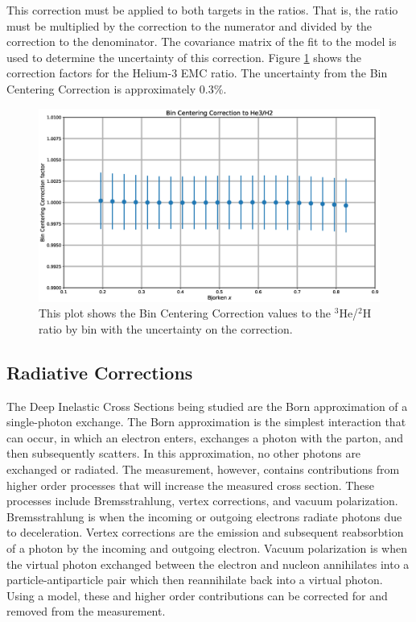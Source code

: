 This correction must be applied to both targets in the ratios. That is, the ratio must be multiplied by the correction to the numerator and divided by the correction to the denominator.\cite{wtsydp} The covariance matrix of the fit to the model is used to determine the uncertainty of this correction. Figure \ref{fig:bcc} shows the correction factors for the Helium-3 EMC ratio. The uncertainty from the Bin Centering Correction is approximately $0.3\%$.

\begin{figure}
	\includegraphics[width=\textwidth]{./analysis/fig/bcc.eps}
	\caption{This plot shows the Bin Centering Correction values to the $^3$He/$^2$H ratio by bin with the uncertainty on the correction.}
	\label{fig:bcc}
\end{figure}

\subsection{Radiative Corrections}

The Deep Inelastic Cross Sections being studied are the Born approximation of a single-photon exchange. The Born approximation is the simplest interaction that can occur, in which an electron enters, exchanges a photon with the parton, and then subsequently scatters. In this approximation, no other photons are exchanged or radiated. The measurement, however, contains contributions from higher order processes that will increase the measured cross section. These processes include Bremsstrahlung, vertex corrections, and vacuum polarization. Bremsstrahlung is when the incoming or outgoing electrons radiate photons due to deceleration. Vertex corrections are the emission and subsequent reabsorbtion of a photon by the incoming and outgoing electron. Vacuum polarization is when the virtual photon exchanged between the electron and nucleon annihilates into a particle-antiparticle pair which then reannihilate back into a virtual photon. Using a model, these and higher order contributions can be corrected for and removed from the measurement.

